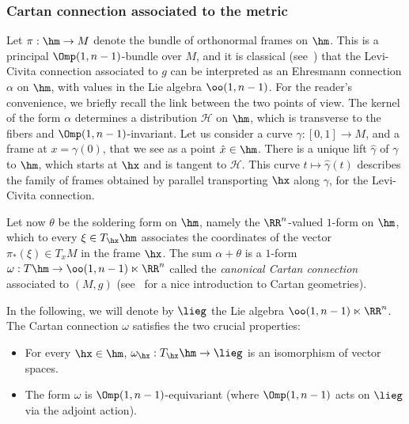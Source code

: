 \subsubsection{Cartan connection associated to the metric}\label{sec.cartan.connection}
Let $\pi: \hm \to M$ denote the bundle of orthonormal frames on $\hm$. This is a principal $\Omp(1,n-1)$-bundle over $M$, and it is classical (see~\cite[Chapter~IV.2]{kobanomi}) that the Levi-Civita connection associated to $g$ can be interpreted as an Ehresmann connection $\alpha$ on $\hm$, with values in the Lie algebra $\oo(1,n-1)$. For the reader's convenience, we briefly recall the link between the two points of view. The kernel of the form $\alpha$ determines a distribution ${\mathcal H}$ on $\hm$, which is transverse to the fibers and $\Omp(1,n-1)$-invariant. Let us consider a curve $\gamma: [0,1] \to M $, and a frame at $x=\gamma(0)$, that we see as a point $\hat{x} \in \hm$. There is a unique lift $\hat{\gamma}$ of $\gamma$ to $\hm$, which starts at $\hx$ and is tangent to ${\mathcal H}$. This curve $t \mapsto \hat{\gamma}(t)$ describes the family of frames obtained by parallel transporting $\hx$ along $\gamma$, for the Levi-Civita connection.


Let now $\theta$ be the soldering form on $\hm$, namely the $\RR^n$-valued $1$-form on $\hm$, which to every $\xi \in T_{\hx}\hm$ associates the coordinates of the vector $\pi_*(\xi) \in T_xM$ in the frame $\hx$. The sum $\alpha + \theta$ is a $1$-form $\omega: T\hm \to \oo(1,n-1) \ltimes \RR^n$ called the \emph{canonical Cartan connection} associated to $(M,g)$ (see~\cite[Chapter~6]{sharpe} for a nice introduction to Cartan geometries).

In the following, we will denote by $\lieg$ the Lie algebra $\oo(1,n-1) \ltimes \RR^n$. The Cartan connection $\omega$ satisfies the two crucial properties:
\begin{itemize}
\item \label{list3.1.1.1}For every $\hx \in \hm$, $\omega_{\hx}: T_{\hx}\hm \to \lieg$ is an isomorphism of vector spaces.
\item \label{list3.1.1.2}The form $\omega$ is $\Omp(1,n-1)$-equivariant (where $\Omp(1,n-1)$ acts on $\lieg$ via the adjoint action).
\end{itemize}

